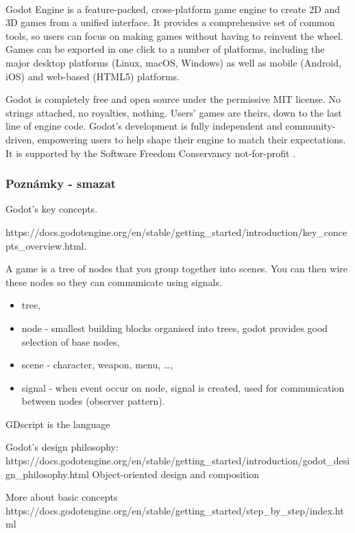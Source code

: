 \paragraph{}
Godot Engine is a feature-packed, cross-platform game engine to create 2D and 3D games from a unified interface. It provides a comprehensive set of common tools, so users can focus on making games without having to reinvent the wheel. Games can be exported in one click to a number of platforms, including the major desktop platforms (Linux, macOS, Windows) as well as mobile (Android, iOS) and web-based (HTML5) platforms.

Godot is completely free and open source under the permissive MIT license. No strings attached, no royalties, nothing. Users' games are theirs, down to the last line of engine code. Godot's development is fully independent and community-driven, empowering users to help shape their engine to match their expectations. It is supported by the Software Freedom Conservancy not-for-profit \cite{godot_introduction} .

\subsubsection{Poznámky - smazat}
Godot's key concepts.

https://docs.godotengine.org/en/stable/getting\_started/introduction/key\_concepts\_overview.html.

A game is a tree of nodes that you group together into scenes. You can then wire these nodes so they can communicate using signals.

\begin{itemize}
	\item tree,
	\item node - smallest building blocks organised into trees, godot provides good selection of base nodes,
	\item scene - character, weapon, menu, \ldots,
	\item  signal - when event occur on node, signal is created, used for communication between nodes (observer pattern).
\end{itemize}

GDscript is the language

Godot's design philosophy:
https://docs.godotengine.org/en/stable/getting\_started/introduction/godot\_design\_philosophy.html
Object-oriented design and composition

More about basic concepts
https://docs.godotengine.org/en/stable/getting\_started/step\_by\_step/index.html

